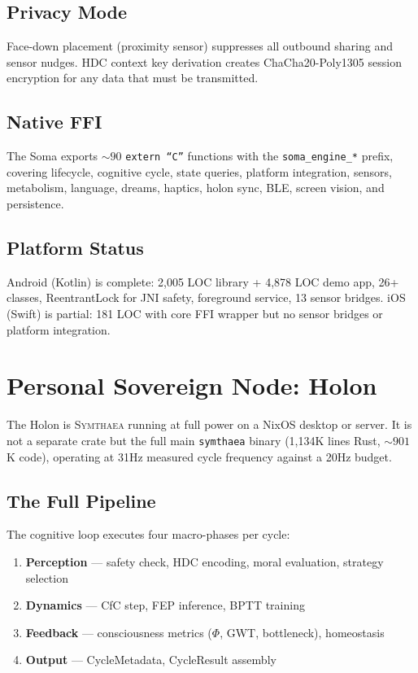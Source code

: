 \documentclass[11pt,twocolumn]{article}
\newcommand{\symthaea}{\textsc{Symthaea}}
\begin{document}
\subsection{Privacy Mode}

Face-down placement (proximity sensor) suppresses all outbound sharing and sensor nudges. HDC context key derivation creates ChaCha20-Poly1305 session encryption for any data that must be transmitted.

\subsection{Native FFI}

The Soma exports ${\sim}90$ \texttt{extern ``C''} functions with the \texttt{soma\_engine\_*} prefix, covering lifecycle, cognitive cycle, state queries, platform integration, sensors, metabolism, language, dreams, haptics, holon sync, BLE, screen vision, and persistence.

\subsection{Platform Status}

Android (Kotlin) is complete: 2,005 LOC library + 4,878 LOC demo app, 26+ classes, ReentrantLock for JNI safety, foreground service, 13 sensor bridges. iOS (Swift) is partial: 181 LOC with core FFI wrapper but no sensor bridges or platform integration.

\section{Personal Sovereign Node: Holon}
\label{sec:holon}

The Holon is \symthaea{} running at full power on a NixOS desktop or server. It is not a separate crate but the full main \texttt{symthaea} binary (1,134K lines Rust, ${\sim}901$K code), operating at 31Hz measured cycle frequency against a 20Hz budget.

\subsection{The Full Pipeline}

The cognitive loop executes four macro-phases per cycle:

\begin{enumerate}[nosep]
  \item \textbf{Perception} --- safety check, HDC encoding, moral evaluation, strategy selection
  \item \textbf{Dynamics} --- CfC step, FEP inference, BPTT training
  \item \textbf{Feedback} --- consciousness metrics ($\Phi$, GWT, bottleneck), homeostasis
  \item \textbf{Output} --- CycleMetadata, CycleResult assembly
\end{enumerate}
\end{document}
